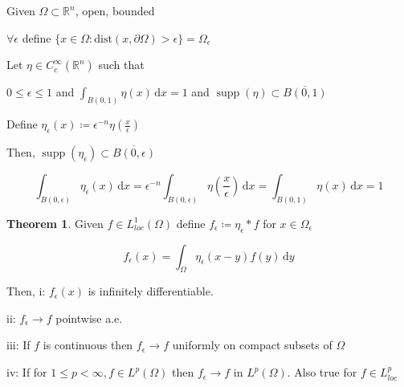\documentclass{article}
\theoremstyle{definition}
\newtheorem{theorem}{Theorem}
\begin{document}
Given \(\Omega \subset \mathbb{R} ^n\), open, bounded

\(\forall \epsilon\) define \(\{ x\in \Omega : \text{dist} (x, \partial \Omega ) > \epsilon \} = \Omega_{\epsilon} \) 

Let \(\eta \in C_c^{\infty} (\mathbb{R}^n)\) such that

\(0 \leq \epsilon \leq 1\) and \(\int_{B(0,1)}^{} \eta (x) \,\mathrm{d}x = 1\) and \(\mathop{\mathrm{supp}}(\eta) \subset \overline{B(0,1)} \) 

Define \(\eta_{\epsilon}(x) \coloneqq \epsilon ^{-n} \eta(\frac{x}{\epsilon}) \) 

Then, \(\mathop{\mathrm{supp}}(\eta _\epsilon) \subset \overline{B(0,\epsilon)} \) 

\[
    \int_{B(0,\epsilon)}^{} \eta _\epsilon (x) \,\mathrm{d}x = \epsilon ^{-n} \int_{B(0,\epsilon)}^{} \eta (\frac{x}{\epsilon }) \,\mathrm{d}x = \int_{B(0,1)}^{} \eta (x) \,\mathrm{d}x = 1
\]

\begin{theorem}
    Given \(f\in L^1_{loc}(\Omega)\) define \(f_{\epsilon} \coloneqq \eta_{\epsilon} \ast f \) for \(x\in \Omega_{\epsilon} \) 
    
    \[
       f_{\epsilon}(x)  = \int_\Omega \eta_{\epsilon} (x-y) f(y) \, \mathrm{d} y
    \]

    Then, i: \(f_{\epsilon}(x)\) is infinitely differentiable.

    ii: \(f_{\epsilon} \to f \) pointwise a.e.
    
    iii: If \(f\) is continuous then \(f_{\epsilon} \to f\) uniformly on compact subsets of \(\Omega\) 

    iv: If for \(1 \leq p < \infty, f\in L^p(\Omega)\) then \(f_{\epsilon} \to f\) in \(L^p(\Omega)\). Also true for \(f\in L_{loc}^p\) 
\end{theorem}
\end{document}
